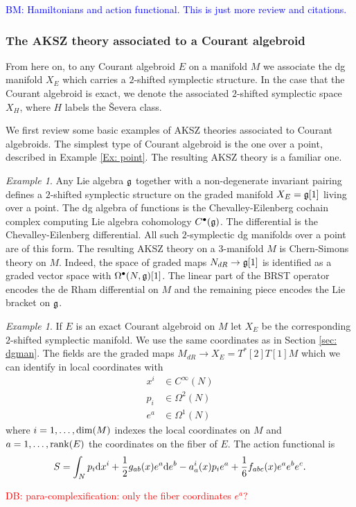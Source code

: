 \documentclass[letterpaper,12pt]{article}
\def\d{{\rm d}}
\theoremstyle{definition}
\theoremstyle{remark}
\theoremstyle{examples}
\newtheorem{Ex}[theorem]{Example}
\def\brian{\textcolor{blue}{BM: }\textcolor{blue}}
\def\david{\textcolor{red}{DB: }\textcolor{red}}
\begin{document}
\brian{Hamiltonians and action functional. This is just more review and citations.}

\subsubsection{The AKSZ theory associated to a Courant algebroid}

From here on, to any Courant algebroid $E$ on a manifold $M$ we associate the dg manifold $X_E$ which carries a $2$-shifted symplectic structure. 
In the case that the Courant algebroid is exact, we denote the associated $2$-shifted symplectic space $X_H$, where $H$ labels the \v{S}evera class. 

We first review some basic examples of AKSZ theories associated to Courant algebroids. 
The simplest type of Courant algebroid is the one over a point, described in Example \ref{Ex: point}. 
The resulting AKSZ theory is a familiar one.

\begin{Ex}\label{ex: cs}
Any Lie algebra $\mathfrak{g}$ together with a non-degenerate invariant pairing defines a $2$-shifted symplectic structure on the graded manifold $X_E = \mathfrak{g}[1]$ living over a point. 
The dg algebra of functions is the Chevalley-Eilenberg cochain complex computing Lie algebra cohomology $C^\bullet(\mathfrak{g})$. 
The differential is the Chevalley-Eilenberg differential.
All such $2$-symplectic dg manifolds over a point are of this form. 
The resulting AKSZ theory on a $3$-manifold $M$ is Chern-Simons theory on $M$. 
Indeed, the space of graded maps $N_{dR} \to \mathfrak{g}[1]$ is identified as a graded vector space with $\Omega^\bullet(N, \mathfrak{g})[1]$.
The linear part of the BRST operator encodes the de Rham differential on $M$ and the remaining piece encodes the Lie bracket on $\mathfrak{g}$. 
\end{Ex}

\begin{Ex} \label{ex: exact CA}
If $E$ is an exact Courant algebroid on $M$ let $X_E$ be the corresponding $2$-shifted symplectic manifold.
We use the same coordinates as in Section \ref{sec: dgman}.
The fields are the graded maps $M_{dR} \to X_E = T^*[2] T[1] M$ which we can identify in local coordinates with
\begin{align*}
x^i &\in C^\infty(N) \\
p_i & \in \Omega^2(N) \\
e^a & \in \Omega^1(N) 
\end{align*}
where $i = 1,\ldots, {\rm dim}(M)$ indexes the local coordinates on $M$ and $a = 1, \ldots, {\rm rank}(E)$ the coordinates on the fiber of $E$.
The action functional is
\[
S = \int_N p_i \d x^i + \frac{1}{2} g_{ab}(x) e^a \d e^b - a_a^i(x) p_i e^a + \frac{1}{6} f_{abc} (x) e^{a} e^b e^c .
\]

\david{para-complexification: only the fiber coordinates $e^a$?}
\end{Ex}
\end{document}
